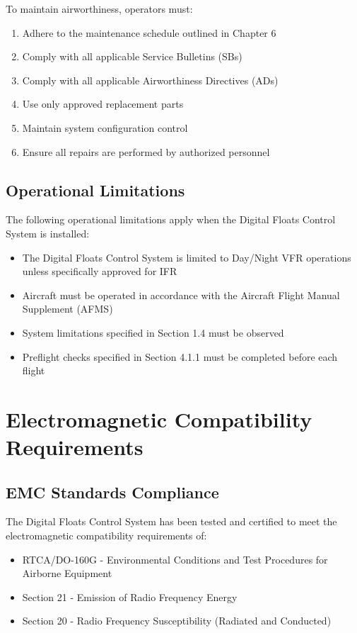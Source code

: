 \documentclass[12pt,a4paper,twoside,openright]{book}
\begin{document}
To maintain airworthiness, operators must:

\begin{enumerate}
    \item Adhere to the maintenance schedule outlined in Chapter 6
    \item Comply with all applicable Service Bulletins (SBs)
    \item Comply with all applicable Airworthiness Directives (ADs)
    \item Use only approved replacement parts
    \item Maintain system configuration control
    \item Ensure all repairs are performed by authorized personnel
\end{enumerate}

\subsection{Operational Limitations}

The following operational limitations apply when the Digital Floats Control System is installed:

\begin{itemize}
    \item The Digital Floats Control System is limited to Day/Night VFR operations unless specifically approved for IFR
    \item Aircraft must be operated in accordance with the Aircraft Flight Manual Supplement (AFMS)
    \item System limitations specified in Section 1.4 must be observed
    \item Preflight checks specified in Section 4.1.1 must be completed before each flight
\end{itemize}

\section{Electromagnetic Compatibility Requirements}

\subsection{EMC Standards Compliance}

The Digital Floats Control System has been tested and certified to meet the electromagnetic compatibility requirements of:

\begin{itemize}
    \item RTCA/DO-160G - Environmental Conditions and Test Procedures for Airborne Equipment
    \item Section 21 - Emission of Radio Frequency Energy
    \item Section 20 - Radio Frequency Susceptibility (Radiated and Conducted)
\end{itemize}
\end{document}
